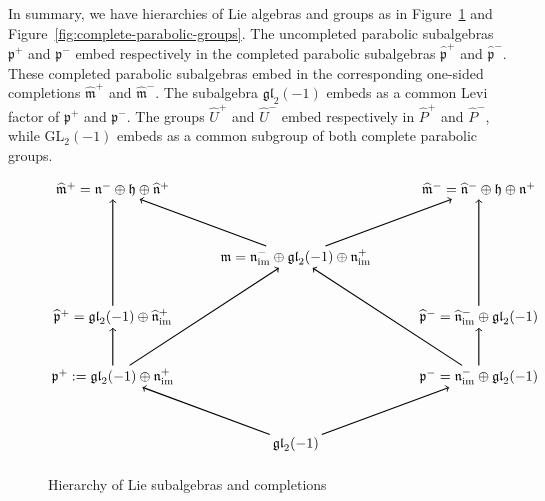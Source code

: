 \documentclass[11pt,letterpaper]{amsart}
\numberwithin{thecounter}{section}
\theoremstyle{definition}
\begin{document}
In summary, we have hierarchies of Lie algebras and groups as in Figure~\ref{fig:lie-algebra-hierarchy} and Figure~\ref{fig:complete-parabolic-groups}.
The uncompleted
parabolic subalgebras \(\mathfrak p^{+}\) and \(\mathfrak p^{-}\) embed
respectively in the completed parabolic subalgebras
\(\widehat{\mathfrak p}^{+}\) and \(\widehat{\mathfrak p}^{-}\). These
completed parabolic subalgebras embed in the corresponding one-sided
completions \(\widehat{\mathfrak m}^{+}\) and
\(\widehat{\mathfrak m}^{-}\). The subalgebra \(\mathfrak{gl}_2(-1)\)
embeds as a common Levi factor of \(\mathfrak p^{+}\) and
\(\mathfrak p^{-}\).
The groups
\(\widehat U^{+}\) and \(\widehat U^{-}\) embed respectively in
\(\widehat P^{+}\) and \(\widehat P^{-}\), while
\(\mathrm{GL}_2(-1)\) embeds as a common subgroup of both complete
parabolic groups.
\begin{figure}[ht]
\centering
\[
\begin{tikzpicture}[
  every node/.style={inner sep=2pt, align=center},
  incl/.style={->, thick}
]

\node (Mhatp) at (-4.6,5.8)
{$\widehat{\mathfrak m}^{+}
=
\mathfrak n^- \oplus \mathfrak h \oplus \widehat{\mathfrak n}^{+}$};

\node (Mhatm) at (4.6,5.8)
{$\widehat{\mathfrak m}^{-}
=
\widehat{\mathfrak n}^{-} \oplus \mathfrak h \oplus \mathfrak n^{+}$};

\node (m) at (0,4.1)
{$\mathfrak m
=
\mathfrak n^-_{\mathrm{im}}
\oplus
\mathfrak{gl}_2(-1)
\oplus
\mathfrak n^+_{\mathrm{im}}$};

\node (Phatp) at (-4.6,2.6)
{$\widehat{\mathfrak p}^{+}
=
\mathfrak{gl}_2(-1)
\oplus
\widehat{\mathfrak n}^{+}_{\mathrm{im}}$};

\node (Phatm) at (4.6,2.6)
{$\widehat{\mathfrak p}^{-}
=
\widehat{\mathfrak n}^{-}_{\mathrm{im}}
\oplus
\mathfrak{gl}_2(-1)$};

\node (Pp) at (-4.6,1.1)
{$\mathfrak p^{+}
:=
\mathfrak{gl}_2(-1)
\oplus
\mathfrak n^{+}_{\mathrm{im}}$};

\node (Pm) at (4.6,1.1)
{$\mathfrak p^{-}
=
\mathfrak n^{-}_{\mathrm{im}}
\oplus
\mathfrak{gl}_2(-1)$};

\node (gl2) at (0,-0.6)
{$\mathfrak{gl}_2(-1)$};

\draw[incl] (m) -- (Mhatp);
\draw[incl] (m) -- (Mhatm);

\draw[incl] (Phatp) -- (Mhatp);
\draw[incl] (Phatm) -- (Mhatm);

\draw[incl] (Pp) -- (Phatp);
\draw[incl] (Pm) -- (Phatm);

\draw[incl] (Pp) -- (m);
\draw[incl] (Pm) -- (m);

\draw[incl] (gl2) -- (Pp);
\draw[incl] (gl2) -- (Pm);

\end{tikzpicture}
\]
\caption{Hierarchy of Lie subalgebras and completions }
\label{fig:lie-algebra-hierarchy}
\end{figure}
\end{document}
